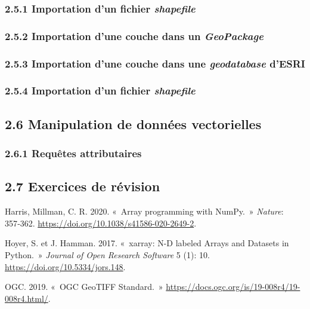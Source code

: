 \documentclass[
]{article}
\newlength{\cslhangindent}
\newenvironment{CSLReferences}[2] %
 {\begin{list}{}{%
  \setlength{\itemindent}{0pt}
  \setlength{\leftmargin}{0pt}
  \setlength{\parsep}{0pt}
  \ifodd #1
   \setlength{\leftmargin}{\cslhangindent}
   \setlength{\itemindent}{-1\cslhangindent}
  \fi
  \setlength{\itemsep}{#2\baselineskip}}}
 {\end{list}}
\begin{document}
\subsubsection{\texorpdfstring{{2.5.1} Importation d'un fichier
\emph{shapefile}}{2.5.1 Importation d'un fichier shapefile}}\label{importation-dun-fichier-shapefile}

\subsubsection{\texorpdfstring{{2.5.2} Importation d'une couche dans un
\emph{GeoPackage}}{2.5.2 Importation d'une couche dans un GeoPackage}}\label{importation-dune-couche-dans-un-geopackage}

\subsubsection{\texorpdfstring{{2.5.3} Importation d'une couche dans une
\emph{geodatabase}
d'ESRI}{2.5.3 Importation d'une couche dans une geodatabase d'ESRI}}\label{importation-dune-couche-dans-une-geodatabase-desri}

\subsubsection{\texorpdfstring{{2.5.4} Importation d'un fichier
\emph{shapefile}}{2.5.4 Importation d'un fichier shapefile}}\label{importation-dun-fichier-shapefile-1}

\subsection{\texorpdfstring{{2.6} Manipulation de données
vectorielles}{2.6 Manipulation de données vectorielles}}\label{manipulation-de-donnuxe9es-vectorielles}

\subsubsection{\texorpdfstring{{2.6.1} Requêtes
attributaires}{2.6.1 Requêtes attributaires}}\label{requuxeates-attributaires}

\subsection{\texorpdfstring{{2.7} Exercices de
révision}{2.7 Exercices de révision}}\label{exercices-de-ruxe9vision}

\label{refs}
\begin{CSLReferences}{1}{0}
Harris, Millman, C. R. 2020. {«~Array programming with NumPy.~»}
\emph{{Nature}}: 357‑362.
\url{https://doi.org/10.1038/s41586-020-2649-2}.

Hoyer, S. et J. Hamman. 2017. {«~xarray: N-D labeled Arrays and Datasets
in Python.~»} \emph{{Journal of Open Research Software}} 5 (1): 10.
\url{https://doi.org/10.5334/jors.148}.

OGC. 2019. {«~{OGC GeoTIFF Standard}.~»}
\url{https://docs.ogc.org/is/19-008r4/19-008r4.html/}.

\end{CSLReferences}
\end{document}
